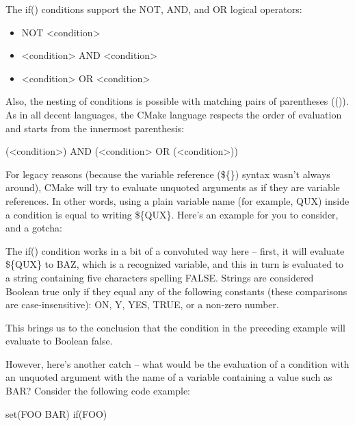 The if() conditions support the NOT, AND, and OR logical operators:

\begin{itemize}
\item
NOT <condition>

\item
<condition> AND <condition>

\item
<condition> OR <condition>
\end{itemize}

Also, the nesting of conditions is possible with matching pairs of parentheses (()). As in all decent languages, the CMake language respects the order of evaluation and starts from the innermost parenthesis:

\begin{shell}
(<condition>) AND (<condition> OR (<condition>))
\end{shell}


For legacy reasons (because the variable reference (\$\{\}) syntax wasn’t always around), CMake will try to evaluate unquoted arguments as if they are variable references. In other words, using a plain variable name (for example, QUX) inside a condition is equal to writing \$\{QUX\}. Here’s an example for you to consider, and a gotcha:


The if() condition works in a bit of a convoluted way here – first, it will evaluate \$\{QUX\} to BAZ, which is a recognized variable, and this in turn is evaluated to a string containing five characters spelling FALSE. Strings are considered Boolean true only if they equal any of the following constants (these comparisons are case-insensitive): ON, Y, YES, TRUE, or a non-zero number.

This brings us to the conclusion that the condition in the preceding example will evaluate to Boolean false.

However, here’s another catch – what would be the evaluation of a condition with an unquoted argument with the name of a variable containing a value such as BAR? Consider the following code example:

\begin{cmake}
set(FOO BAR)
if(FOO)
\end{cmake}

